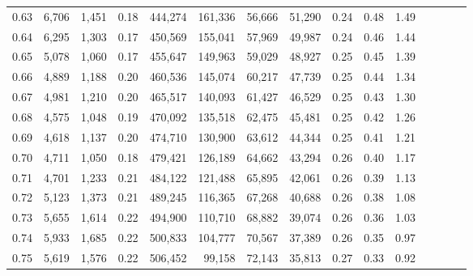 \begin{tabular}{rrrcrrrrrrrrrrr}
0.63 &   6,706 &  1,451 &                                       0.18 &  444,274 &  161,336 &   56,666 &   51,290 &  0.24 &  0.48 &                         1.49 \\
0.64 &   6,295 &  1,303 &                                       0.17 &  450,569 &  155,041 &   57,969 &   49,987 &  0.24 &  0.46 &                         1.44 \\
0.65 &   5,078 &  1,060 &                                       0.17 &  455,647 &  149,963 &   59,029 &   48,927 &  0.25 &  0.45 &                         1.39 \\
0.66 &   4,889 &  1,188 &                                       0.20 &  460,536 &  145,074 &   60,217 &   47,739 &  0.25 &  0.44 &                         1.34 \\
0.67 &   4,981 &  1,210 &                                       0.20 &  465,517 &  140,093 &   61,427 &   46,529 &  0.25 &  0.43 &                         1.30 \\
0.68 &   4,575 &  1,048 &                                       0.19 &  470,092 &  135,518 &   62,475 &   45,481 &  0.25 &  0.42 &                         1.26 \\
0.69 &   4,618 &  1,137 &                                       0.20 &  474,710 &  130,900 &   63,612 &   44,344 &  0.25 &  0.41 &                         1.21 \\
0.70 &   4,711 &  1,050 &                                       0.18 &  479,421 &  126,189 &   64,662 &   43,294 &  0.26 &  0.40 &                         1.17 \\
0.71 &   4,701 &  1,233 &                                       0.21 &  484,122 &  121,488 &   65,895 &   42,061 &  0.26 &  0.39 &                         1.13 \\
0.72 &   5,123 &  1,373 &                                       0.21 &  489,245 &  116,365 &   67,268 &   40,688 &  0.26 &  0.38 &                         1.08 \\
0.73 &   5,655 &  1,614 &                                       0.22 &  494,900 &  110,710 &   68,882 &   39,074 &  0.26 &  0.36 &                         1.03 \\
0.74 &   5,933 &  1,685 &                                       0.22 &  500,833 &  104,777 &   70,567 &   37,389 &  0.26 &  0.35 &                         0.97 \\
0.75 &   5,619 &  1,576 &                                       0.22 &  506,452 &   99,158 &   72,143 &   35,813 &  0.27 &  0.33 &                         0.92 \\

\end{tabular}
